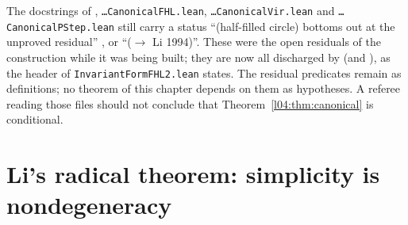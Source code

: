 \begin{warning}[title={Trap / dead end: Stale status lines in the intermediate files}]\label{l04:warn:stale}
The docstrings of ,
\texttt{…CanonicalFHL.lean}, \texttt{…CanonicalVir.lean} and \texttt{…CanonicalPStep.lean} still carry a
status ``(half-filled circle) bottoms out at the unproved residual'' ,  or
 ``($\to$ Li 1994)''. These were the open residuals of the construction while it was being
built; they are now all discharged by \allowbreak{} (and
\allowbreak{}\allowbreak{}), as the header of \texttt{InvariantFormFHL2.lean} states. The
residual predicates remain as definitions; no theorem of this chapter depends on them as hypotheses. A
referee reading those files should not conclude that Theorem~\ref{l04:thm:canonical} is conditional.
\end{warning}

\section{Li's radical theorem: simplicity is nondegeneracy}\label{l04:sec:li}


